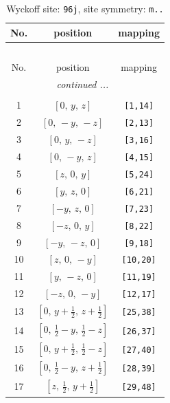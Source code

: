\documentclass[fleqn,8pt]{jsarticle}
\begin{document}
\begin{longtable}{ccc}
\caption{Wyckoff site: {\tt 96j}, site symmetry: {\tt m..}}
 \\
 \hline \hline
No. & position & mapping \\ \hline \endfirsthead

\multicolumn{2}{l}{\tablename\ \thetable{}} \\
 \hline \hline
No. & position & mapping \\ \hline \endhead

 \hline \hline
\multicolumn{2}{r}{\footnotesize\it continued ...} \\ \endfoot

 \hline \hline
\multicolumn{2}{r}{} \\ \endlastfoot

1 & $\left[ 0,\, y,\, z \right]$ & {\tt [1,14]} \\ \hline
2 & $\left[ 0,\, - y,\, - z \right]$ & {\tt [2,13]} \\ \hline
3 & $\left[ 0,\, y,\, - z \right]$ & {\tt [3,16]} \\ \hline
4 & $\left[ 0,\, - y,\, z \right]$ & {\tt [4,15]} \\ \hline
5 & $\left[ z,\, 0,\, y \right]$ & {\tt [5,24]} \\ \hline
6 & $\left[ y,\, z,\, 0 \right]$ & {\tt [6,21]} \\ \hline
7 & $\left[ - y,\, z,\, 0 \right]$ & {\tt [7,23]} \\ \hline
8 & $\left[ - z,\, 0,\, y \right]$ & {\tt [8,22]} \\ \hline
9 & $\left[ - y,\, - z,\, 0 \right]$ & {\tt [9,18]} \\ \hline
10 & $\left[ z,\, 0,\, - y \right]$ & {\tt [10,20]} \\ \hline
11 & $\left[ y,\, - z,\, 0 \right]$ & {\tt [11,19]} \\ \hline
12 & $\left[ - z,\, 0,\, - y \right]$ & {\tt [12,17]} \\ \hline
13 & $\left[ 0,\, y + \frac{1}{2},\, z + \frac{1}{2} \right]$ & {\tt [25,38]} \\ \hline
14 & $\left[ 0,\, \frac{1}{2} - y,\, \frac{1}{2} - z \right]$ & {\tt [26,37]} \\ \hline
15 & $\left[ 0,\, y + \frac{1}{2},\, \frac{1}{2} - z \right]$ & {\tt [27,40]} \\ \hline
16 & $\left[ 0,\, \frac{1}{2} - y,\, z + \frac{1}{2} \right]$ & {\tt [28,39]} \\ \hline
17 & $\left[ z,\, \frac{1}{2},\, y + \frac{1}{2} \right]$ & {\tt [29,48]} \\ \hline

\end{longtable}
\end{document}
